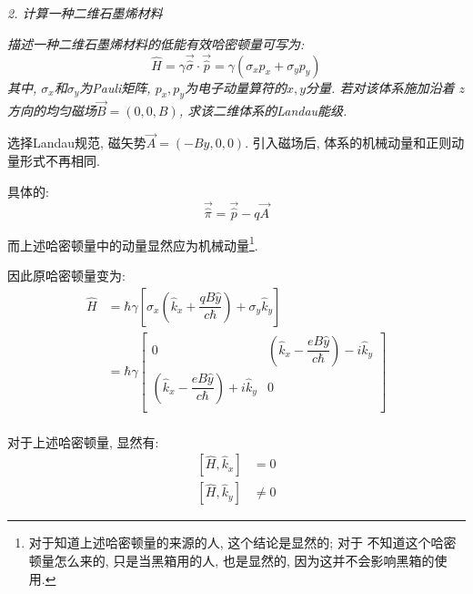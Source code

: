 \documentclass[a4paper, 11pt]{article}
\begin{document}
\begin{spacing}{1.2}
        \emph{2. 计算一种二维石墨烯材料}
        
        \emph{描述一种二维石墨烯材料的低能有效哈密顿量可写为:}
        \begin{equation}
          \hat{H} = \gamma\vec{\hat{\sigma}}\cdot\vec{\hat{p}} = %
          \gamma\left(\sigma_xp_x+\sigma_yp_y\right)
        \end{equation}
        \emph{其中, $\sigma_x$和$\sigma_y$为Pauli矩阵, $p_x, p_y$为电子动量算符的$x,y$分量. 若对该体系施加沿着
        $z$方向的均匀磁场$\vec{B}=(0,0,B)$, 求该二维体系的Landau能级.}

        选择Landau规范, 磁矢势$\vec{A} = (-By, 0, 0)$. 引入磁场后, 体系的机械动量和正则动量形式不再相同. 

        具体的:
        \begin{equation}
          \vec{\hat{\pi}} = \vec{\hat{p}} - q\vec{A} 
        \end{equation}

        而上述哈密顿量中的动量显然应为机械动量\footnote{对于知道上述哈密顿量的来源的人, 这个结论是显然的; 对于
        不知道这个哈密顿量怎么来的, 只是当黑箱用的人, 也是显然的, 因为这并不会影响黑箱的使用.}. 

        因此原哈密顿量变为:
        \begin{equation}
          \begin{aligned}
            \hat{H} &= \hbar\gamma\left[\sigma_x\left(\hat{k}_x+\dfrac{qB\hat{y}}{c\hbar}\right)%
            +\sigma_y\hat{k}_y\right] \\
            &=\hbar\gamma%
            \begin{bmatrix}
              0        & \left(\hat{k}_x-\dfrac{eB\hat{y}}{c\hbar}\right)-i\hat{k}_y  \\
              \left(\hat{k}_x-\dfrac{eB\hat{y}}{c\hbar}\right)+i\hat{k}_y & 0         \\
            \end{bmatrix}\\
          \end{aligned}
        \end{equation}
        
        对于上述哈密顿量, 显然有:
        \begin{equation}
          \begin{aligned}
            \left[\hat{H}, \hat{k}_x\right] &= 0\\
            \left[\hat{H}, \hat{k}_y\right] &\ne 0
          \end{aligned}
        \end{equation}


\end{spacing}
\end{document}
